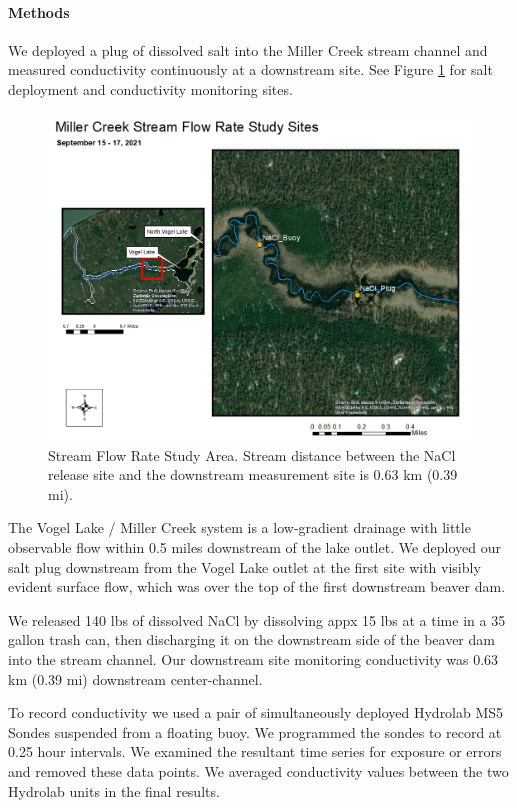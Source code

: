 \documentclass[
]{book}
\begin{document}
\hypertarget{methods}{%
\paragraph{Methods}\label{methods}}

We deployed a plug of dissolved salt into the Miller Creek stream channel and measured conductivity continuously at a downstream site. See Figure \ref{fig:nacl-map} for salt deployment and conductivity monitoring sites.

\begin{figure}
\includegraphics[width=14.67in]{images/stream_flow_rate_sites} \caption{Stream Flow Rate Study Area. Stream distance between the NaCl release site and the downstream measurement site is 0.63 km (0.39 mi).}\label{fig:nacl-map}
\end{figure}

The Vogel Lake / Miller Creek system is a low-gradient drainage with little observable flow within 0.5 miles downstream of the lake outlet. We deployed our salt plug downstream from the Vogel Lake outlet at the first site with visibly evident surface flow, which was over the top of the first downstream beaver dam.

We released 140 lbs of dissolved NaCl by dissolving appx 15 lbs at a time in a 35 gallon trash can, then discharging it on the downstream side of the beaver dam into the stream channel. Our downstream site monitoring conductivity was 0.63 km (0.39 mi) downstream center-channel.

To record conductivity we used a pair of simultaneously deployed Hydrolab MS5 Sondes suspended from a floating buoy. We programmed the sondes to record at 0.25 hour intervals. We examined the resultant time series for exposure or errors and removed these data points. We averaged conductivity values between the two Hydrolab units in the final results.
\end{document}

